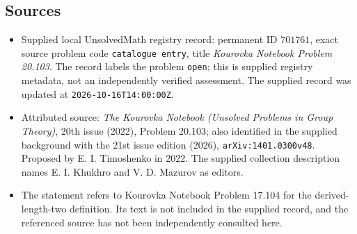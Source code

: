 \documentclass[11pt]{article}
\begin{document}
\subsection{Sources}
\begin{itemize}
\item Supplied local UnsolvedMath registry record: permanent ID \(701761\), exact source problem code \texttt{catalogue entry}, title \emph{Kourovka Notebook Problem 20.103}. The record labels the problem \texttt{open}; this is supplied registry metadata, not an independently verified assessment. The supplied record was updated at \texttt{2026-10-16T14:00:00Z}.
\item Attributed source: \emph{The Kourovka Notebook (Unsolved Problems in Group Theory)}, 20th issue (2022), Problem 20.103; also identified in the supplied background with the 21st issue edition (2026), \texttt{arXiv:1401.0300v48}. Proposed by E. I. Timoshenko in 2022. The supplied collection description names E. I. Khukhro and V. D. Mazurov as editors.
\item The statement refers to Kourovka Notebook Problem 17.104 for the derived-length-two definition. Its text is not included in the supplied record, and the referenced source has not been independently consulted here.
\end{itemize}
\end{document}
